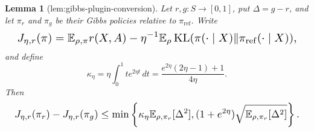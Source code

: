 \documentclass{article}
\newtheorem{lemma}{Lemma}
\begin{document}
\begin{lemma}[lem:gibbs-plugin-conversion]\label{lem:gibbs-plugin-conversion}
Let \(r,g:S\to[0,1]\), put \(\Delta=g-r\), and let \(\pi_r\) and \(\pi_g\) be their Gibbs policies relative to \(\pi_{\mathrm{ref}}\). Write
\[
\makebox[\linewidth][c]{\resizebox{0.98\linewidth}{!}{\par\noindent \makebox[\linewidth][c]{\resizebox{0.98\linewidth}{!}{\(\displaystyle \displaystyle J_{\eta,r}(\pi)=\mathbb E_{\rho,\pi}r(X,A)-\eta^{-1}\mathbb E_\rho\operatorname{KL}(\pi(\cdot\mid X)\Vert\pi_{\mathrm{ref}}(\cdot\mid X)),\)}}\par\noindent}}
\]
and define
\[
\kappa_\eta=\eta\int_0^1t e^{2\eta t}\,dt
=\frac{e^{2\eta}(2\eta-1)+1}{4\eta}.
\]
Then
\[
\makebox[\linewidth][c]{\resizebox{0.98\linewidth}{!}{\(\displaystyle J_{\eta,r}(\pi_r)-J_{\eta,r}(\pi_g)
\le\min\left\{
\kappa_\eta\mathbb E_{\rho,\pi_r}[\Delta^2],
(1+e^{2\eta})\sqrt{\mathbb E_{\rho,\pi_r}[\Delta^2]}
\right\}.\)}}
\]
\end{lemma}
\end{document}

